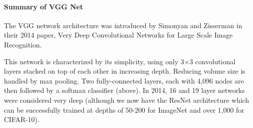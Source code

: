 \documentclass[11pt]{article}
\begin{document}
    

    \paragraph{Summary of VGG Net}\label{summary-of-vgg-net}

The VGG network architecture was introduced by Simonyan and Zisserman in
their 2014 paper, Very Deep Convolutional Networks for Large Scale Image
Recognition.

This network is characterized by its simplicity, using only 3×3
convolutional layers stacked on top of each other in increasing depth.
Reducing volume size is handled by max pooling. Two fully-connected
layers, each with 4,096 nodes are then followed by a softmax classifier
(above). In 2014, 16 and 19 layer networks were considered very deep
(although we now have the ResNet architecture which can be successfully
trained at depths of 50-200 for ImageNet and over 1,000 for CIFAR-10).
\end{document}
